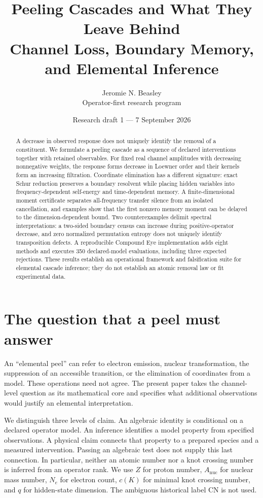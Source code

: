 \documentclass[11pt]{article}
\title{Peeling Cascades and What They Leave Behind\\\large Channel Loss, Boundary Memory, and Elemental Inference}
\author{Jeromie N. Beasley\\\small Operator-first research program}
\date{Research draft 1 --- 7 September 2026}
\begin{document}
\maketitle
\begin{abstract}
A decrease in observed response does not uniquely identify the removal of a constituent. We formulate a peeling cascade as a sequence of declared interventions together with retained observables. For fixed real channel amplitudes with decreasing nonnegative weights, the response forms decrease in Loewner order and their kernels form an increasing filtration. Coordinate elimination has a different signature: exact Schur reduction preserves a boundary resolvent while placing hidden variables into frequency-dependent self-energy and time-dependent memory. A finite-dimensional moment certificate separates all-frequency transfer silence from an isolated cancellation, and examples show that the first nonzero memory moment can be delayed to the dimension-dependent bound. Two counterexamples delimit spectral interpretations: a two-sided boundary census can increase during positive-operator decrease, and zero normalized permutation entropy does not uniquely identify transposition defects. A reproducible Compound Eye implementation adds eight methods and executes 350 declared-model evaluations, including three expected rejections. These results establish an operational framework and falsification suite for elemental cascade inference; they do not establish an atomic removal law or fit experimental data.
\end{abstract}

\section{The question that a peel must answer}
An ``elemental peel'' can refer to electron emission, nuclear transformation, the suppression of an accessible transition, or the elimination of coordinates from a model. These operations need not agree. The present paper takes the channel-level question as its mathematical core and specifies what additional observations would justify an elemental interpretation.

We distinguish three levels of claim. An algebraic identity is conditional on a declared operator model. An inference identifies a model property from specified observations. A physical claim connects that property to a prepared species and a measured intervention. Passing an algebraic test does not supply this last connection. In particular, neither an atomic number nor a knot crossing number is inferred from an operator rank. We use $Z$ for proton number, $A_{\mathrm{nuc}}$ for nuclear mass number, $N_e$ for electron count, $c(K)$ for minimal knot crossing number, and $q$ for hidden-state dimension. The ambiguous historical label CN is not used.
\end{document}
